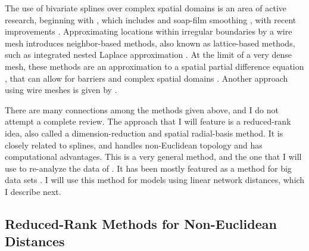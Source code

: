 \documentclass[11pt, titlepage]{article}\usepackage[]{graphicx}\usepackage[]{color}
\begin{document}
\begin{spacing}{1.9}
\begin{flushleft}
The use of bivariate splines over complex spatial domains is an area of active research, beginning with \citet{Rams:spli:2002}, which includes \citet{Wang:Rana:low:2007} and soap-film smoothing \citep{Wood:Brav:Hedl:soap:2008}, with recent improvements \citep{Sang:Rams:Rams:spat:2013, Mill:Wood:fini:2014}. Approximating locations within irregular boundaries by a wire mesh introduces neighbor-based methods, also known as lattice-based methods, such as integrated nested Laplace approximation \citep[INLA,][]{Rue:Mart:Chop:appr:2009}.  At the limit of a very dense mesh, these methods are an approximation to a spatial partial difference equation \citep[SPDE,][]{Lind:Rue:Lind:expl:2011}, that can allow for barriers and complex spatial domains \citep{Bakk:Vanh:Illi:Simp:acco:2016}.  Another approach using wire meshes is given by \citet{McIn:Barr:latt:2017}. 

There are many connections among the methods given above, and I do not attempt a complete review. The approach that I will feature is a reduced-rank idea, also called a dimension-reduction \citep{Wikl:Cres:dime:1999} and spatial radial-basis \citep{Lin:Chen:spat:2004, Hefl:Brom:Bros:Bude:basi:2016} method. It is closely related to splines, and handles non-Euclidean topology and has computational advantages.  This is a very general method, and the one that I will use to re-analyze the data of \citet{Ladl:Avga:Whea:Boyc:pred:2016}.  It has been mostly featured as a method for big data sets \citep[e.g.][]{Wikl:Cres:dime:1999, Rupp:Wand:Carr:semi:2003, Cres:Gard:fixe:2008,Bane:Gelf:Finl:Sang:gaus:2008}.  I will use this method for models using linear network distances, which I describe next.


\subsection*{Reduced-Rank Methods for Non-Euclidean Distances}


\end{flushleft}
\end{spacing}
\end{document}
